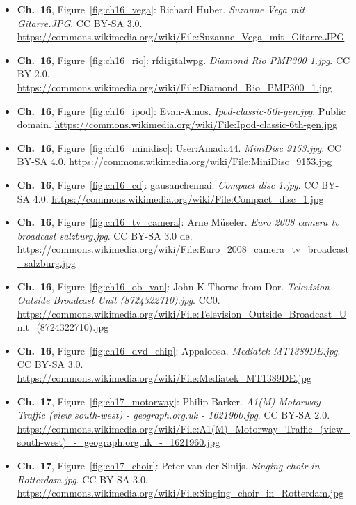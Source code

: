 \begin{small}
\begin{itemize}[leftmargin=0pt,itemsep=2pt,label={}]
\item \textbf{Ch.~16}, Figure~\ref{fig:ch16_vega}: Richard Huber. \emph{Suzanne Vega mit Gitarre.\allowbreak{}JPG}. CC BY-SA 3.0. \url{https://commons.wikimedia.org/wiki/File:Suzanne_Vega_mit_Gitarre.JPG}
\item \textbf{Ch.~16}, Figure~\ref{fig:ch16_rio}: rfdigitalwpg. \emph{Diamond Rio PMP300 1.\allowbreak{}jpg}. CC BY 2.0. \url{https://commons.wikimedia.org/wiki/File:Diamond_Rio_PMP300_1.jpg}
\item \textbf{Ch.~16}, Figure~\ref{fig:ch16_ipod}: Evan-Amos. \emph{Ipod-\allowbreak{}classic-\allowbreak{}6th-\allowbreak{}gen.\allowbreak{}jpg}. Public domain. \url{https://commons.wikimedia.org/wiki/File:Ipod-classic-6th-gen.jpg}
\item \textbf{Ch.~16}, Figure~\ref{fig:ch16_minidisc}: User:Amada44. \emph{MiniDisc 9153.\allowbreak{}jpg}. CC BY-SA 4.0. \url{https://commons.wikimedia.org/wiki/File:MiniDisc_9153.jpg}
\item \textbf{Ch.~16}, Figure~\ref{fig:ch16_cd}: gausanchennai. \emph{Compact disc 1.\allowbreak{}jpg}. CC BY-SA 4.0. \url{https://commons.wikimedia.org/wiki/File:Compact_disc_1.jpg}
\item \textbf{Ch.~16}, Figure~\ref{fig:ch16_tv_camera}: Arne Müseler. \emph{Euro 2008 camera tv broadcast salzburg.\allowbreak{}jpg}. CC BY-SA 3.0 de. \url{https://commons.wikimedia.org/wiki/File:Euro_2008_camera_tv_broadcast_salzburg.jpg}
\item \textbf{Ch.~16}, Figure~\ref{fig:ch16_ob_van}: John K Thorne from Dor. \emph{Television Outside Broadcast Unit (8724322710).\allowbreak{}jpg}. CC0. \url{https://commons.wikimedia.org/wiki/File:Television_Outside_Broadcast_Unit_(8724322710).jpg}
\item \textbf{Ch.~16}, Figure~\ref{fig:ch16_dvd_chip}: Appaloosa. \emph{Mediatek MT1389DE.\allowbreak{}jpg}. CC BY-SA 3.0. \url{https://commons.wikimedia.org/wiki/File:Mediatek_MT1389DE.jpg}
\item \textbf{Ch.~17}, Figure~\ref{fig:ch17_motorway}: Philip Barker. \emph{A1(M) Motorway Traffic (view south-\allowbreak{}west) -\allowbreak{} geograph.\allowbreak{}org.\allowbreak{}uk -\allowbreak{} 1621960.\allowbreak{}jpg}. CC BY-SA 2.0. \url{https://commons.wikimedia.org/wiki/File:A1(M)_Motorway_Traffic_(view_south-west)_-_geograph.org.uk_-_1621960.jpg}
\item \textbf{Ch.~17}, Figure~\ref{fig:ch17_choir}: Peter van der Sluijs. \emph{Singing choir in Rotterdam.\allowbreak{}jpg}. CC BY-SA 3.0. \url{https://commons.wikimedia.org/wiki/File:Singing_choir_in_Rotterdam.jpg}

\end{itemize}
\end{small}
